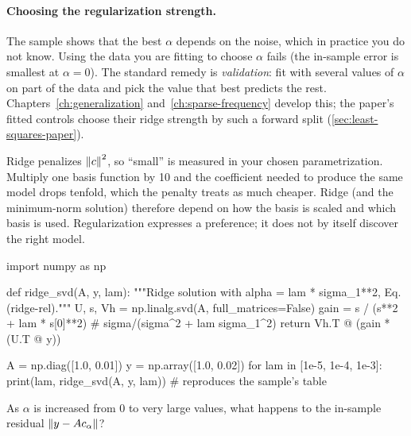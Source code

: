 \paragraph{Choosing the regularization strength.} The sample shows that the best $\alpha$ depends on the noise, which in practice you do not know. Using the data you are fitting to choose $\alpha$ fails (the in-sample error is smallest at $\alpha=0$). The standard remedy is \emph{validation}: fit with several values of $\alpha$ on part of the data and pick the value that best predicts the rest. Chapters~\ref{ch:generalization} and~\ref{ch:sparse-frequency} develop this; the paper's fitted controls choose their ridge strength by such a forward split (\cref{sec:least-squares-paper}).

\begin{pitfall}
Ridge penalizes $\left\lVert c\right\rVert^2$, so ``small'' is measured in your chosen parametrization. Multiply one basis function by 10 and the coefficient needed to produce the same model drops tenfold, which the penalty treats as much cheaper. Ridge (and the minimum-norm solution) therefore depend on how the basis is scaled and which basis is used. Regularization expresses a preference; it does not by itself discover the right model.
\end{pitfall}

\begin{pycode}
import numpy as np

def ridge_svd(A, y, lam):
    """Ridge solution with alpha = lam * sigma_1**2, Eq. (ridge-rel)."""
    U, s, Vh = np.linalg.svd(A, full_matrices=False)
    gain = s / (s**2 + lam * s[0]**2)      # sigma/(sigma^2 + lam sigma_1^2)
    return Vh.T @ (gain * (U.T @ y))

A = np.diag([1.0, 0.01])
y = np.array([1.0, 0.02])
for lam in [1e-5, 1e-4, 1e-3]:
    print(lam, ridge_svd(A, y, lam))       # reproduces the sample's table
\end{pycode}

\begin{checkpoint}
As $\alpha$ is increased from $0$ to very large values, what happens to the in-sample residual $\left\lVert y - Ac_\alpha\right\rVert$?
\end{checkpoint}

